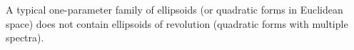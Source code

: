 A typical one-parameter family of ellipsoids (or quadratic forms in Euclidean space) does not contain ellipsoids of revolution (quadratic forms with multiple spectra).
